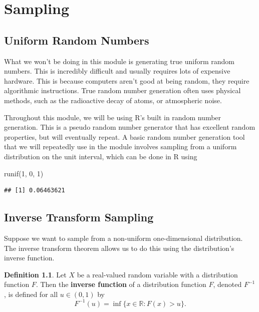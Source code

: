 \documentclass[
]{book}
\newenvironment{Shaded}{\begin{snugshade}}{\end{snugshade}}
\newcommand{\DecValTok}[1]{\textcolor[rgb]{0.00,0.00,0.81}{#1}}
\newcommand{\FunctionTok}[1]{\textcolor[rgb]{0.00,0.00,0.00}{#1}}
\newcommand{\NormalTok}[1]{#1}
\theoremstyle{definition}
\newtheorem{definition}{Definition}[chapter]
\theoremstyle{definition}
\theoremstyle{definition}
\theoremstyle{definition}
\theoremstyle{remark}
\begin{document}
\hypertarget{sampling}{%
\chapter{Sampling}\label{sampling}}

\hypertarget{uniform-random-numbers}{%
\section{Uniform Random Numbers}\label{uniform-random-numbers}}

What we won't be doing in this module is generating true uniform random numbers. This is incredibly difficult and usually requires lots of expensive hardware. This is because computers aren't good at being random, they require algorithmic instructions. True random number generation often uses physical methods, such as the radioactive decay of atoms, or atmospheric noise.

Throughout this module, we will be using R's built in random number generation. This is a pseudo random number generator that has excellent random properties, but will eventually repeat. A basic random number generation tool that we will repeatedly use in the module involves sampling from a uniform distribution on the unit interval, which can be done in R using

\begin{Shaded}
\begin{Highlighting}[]
\FunctionTok{runif}\NormalTok{(}\DecValTok{1}\NormalTok{, }\DecValTok{0}\NormalTok{, }\DecValTok{1}\NormalTok{)}
\end{Highlighting}
\end{Shaded}

\begin{verbatim}
## [1] 0.06463621
\end{verbatim}

\hypertarget{inverse-transform-sampling}{%
\section{Inverse Transform Sampling}\label{inverse-transform-sampling}}

Suppose we want to sample from a non-uniform one-dimensional distribution. The inverse transform theorem allows us to do this using the distribution's inverse function.

\begin{definition}
Let \(X\) be a real-valued random variable with a distribution function \(F\). Then the \textbf{inverse function} of a distribution function \(F\), denoted \(F^{-1}\), is defined for all \(u \in (0, 1)\) by
\[
F^{-1}(u) = \inf\{x \in\mathbb{R} : F(x) > u\}.
\]
\end{definition}
\end{document}
